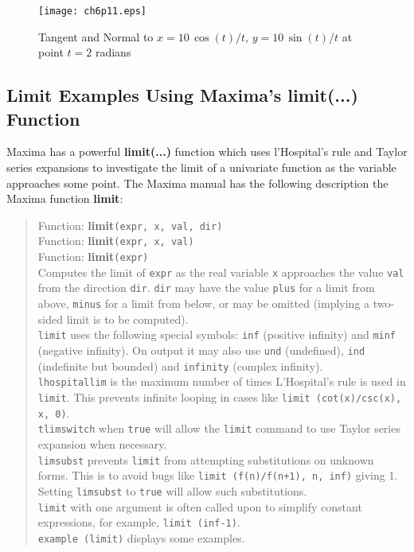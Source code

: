 \documentclass[12pt]{article}
\begin{document}
\begin{figure} [h]
   \centerline{\texttt{[image: ch6p11.eps]} }
	\caption{ Tangent and Normal to $x=10\,\cos(t)/t,\,y=10\,\sin(t)/t$ at point $t=2$ radians  }
\end{figure} 


\subsection{Limit Examples Using Maxima's limit(...) Function}
Maxima has a powerful \textbf{limit(...)} function which uses l'Hospital's rule and Taylor
  series expansions to investigate the limit of a univariate function as the variable
  approaches some point.
The Maxima manual has the following description the Maxima function \textbf{limit}:
\small
\begin{quote}
Function: \textbf{limit}\verb|(expr, x, val, dir)|\\
Function: \textbf{limit}\verb|(expr, x, val) |\\
Function: \textbf{limit}\verb|(expr)|\\ 
Computes the limit of \verb|expr| as the real variable \verb|x| approaches
 the value \verb|val| from the direction \verb|dir|.
\verb|dir| may have the value \verb|plus| for a limit from above,
  \verb|minus| for a limit from below, or may be omitted (implying
   a two-sided limit is to be computed). \\
\verb|limit| uses the following special symbols: \verb|inf| (positive infinity)
   and \verb|minf| (negative infinity).
On output it may also use \verb|und| (undefined), \verb|ind| (indefinite but bounded)
  and \verb|infinity| (complex infinity). \\
\verb|lhospitallim| is the maximum number of times L'Hospital's rule is used in \verb|limit|.
This prevents infinite looping in cases like \verb|limit (cot(x)/csc(x), x, 0)|.\\ 
\verb|tlimswitch| when \verb|true| will allow the \verb|limit| command
   to use Taylor series expansion when necessary. \\
\verb|limsubst| prevents \verb|limit| from attempting substitutions on unknown forms.
This is to avoid bugs like \verb|limit (f(n)/f(n+1), n, inf)| giving 1.
Setting \verb|limsubst| to \verb|true| will allow such substitutions. \\
\verb|limit| with one argument is often called upon to simplify constant
  expressions, for example, \verb|limit (inf-1)|. \\
\verb|example (limit)| displays some examples. 
\end{quote}
\end{document}

